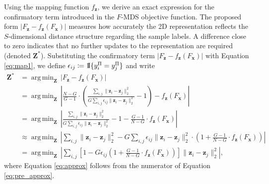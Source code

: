 \documentclass[11pt]{article}
\newcommand{\1}{{\rm 1}\kern-0.24em{\rm I}}
\DeclareMathOperator*{\argmin}{arg\,min}
\begin{document}
Using the mapping function $f_\mathbf{z}$, we derive an exact expression for the confirmatory term introduced in the $F$-MDS objective function. The proposed form $\left|F_\mathbf{z} - f_\mathbf{z}(F_\mathbf{x})\right|$ measures how accurately the 2D representation reflects the $S$-dimensional distance structure regarding the sample labels. A difference close to zero indicates that no further updates to the representation are required (denoted $\mathbf{Z}^*$). Substituting the confirmatory term $\left|F_\mathbf{z} - f_\mathbf{z}(F_\mathbf{x})\right|$ with Equation \ref{eq:map1}, we define $\epsilon_{ij}\coloneqq\1\{y_i^\Pi = y_j^\Pi\}$ and write
\begin{align}
\mathbf{Z}^* &= \argmin_\mathbf{Z}\,\left|F_\mathbf{z} - f_\mathbf{z}(F_\mathbf{x})\right| \\
& = \argmin_\mathbf{Z}\,\left|\frac{N-G}{G-1}\cdot\left(\frac{\sum_{i,j}\|\mathbf{z}_i - \mathbf{z}_j\|_2^2}{G\sum_{i,j}\epsilon_{ij}\|\mathbf{z}_i - \mathbf{z}_j\|_2^2} -1 \right) - f_\mathbf{z}(F_\mathbf{x})\right| \\
&= \argmin_\mathbf{Z}\,\left|\frac{\sum_{i,j}\|\mathbf{z}_i - \mathbf{z}_j\|_2^2}{G\sum_{i,j}\epsilon_{ij}\|\mathbf{z}_i - \mathbf{z}_j\|_2^2} -1 - \frac{G-1}{N-G}\cdot{f_\mathbf{z}(F_\mathbf{x})} \right| \label{eq:pre_approx}\\
&\approx \argmin_\mathbf{Z}\,\left| \sum_{i,j}\|\mathbf{z}_i - \mathbf{z}_j\|_2^2 - G\sum_{i,j}\epsilon_{ij}\|\mathbf{z}_i - \mathbf{z}_j\|_2^2 \cdot \left(1+\frac{G-1}{N-G}\cdot{f_\mathbf{z}(F_\mathbf{x})}\right) \right| \label{eq:approx}\\
&= \argmin_\mathbf{Z}\,\left|\sum_{i,j} \left[1- G\epsilon_{ij} \left(1+\frac{G-1}{N-G}\cdot{f_\mathbf{z}(F_\mathbf{x})}\right)\right] \|\mathbf{z}_i - \mathbf{z}_j\|_2^2\right| \label{eq:pre_conf},
\end{align}
where Equation \ref{eq:approx} follows from the numerator of Equation \ref{eq:pre_approx}. 
\end{document}
